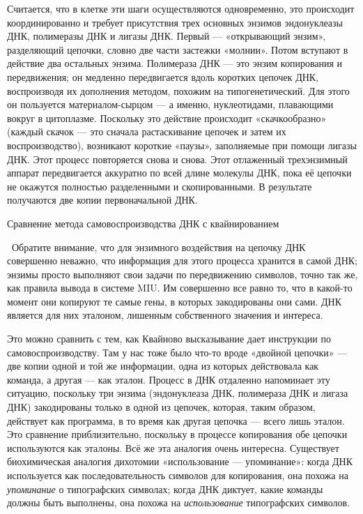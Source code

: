 \documentclass[../main.tex]{subfiles}
\begin{document}
Считается, что в клетке эти шаги осуществляются одновременно, это происходит координированно и требует присутствия трех основных энзимов эндонуклеазы ДНК, полимеразы ДНК и лигазы ДНК\@. Первый --- «открывающий энзим», разделяющий цепочки, словно две части застежки «молнии». Потом вступают в действие два остальных энзима. Полимераза ДНК --- это энзим копирования и передвижения; он медленно передвигается вдоль коротких цепочек ДНК, воспроизводя их дополнения методом, похожим на типогенетический. Для этого он пользуется материалом-сырцом --- а именно, нуклеотидами, плавающими вокруг в цитоплазме. Поскольку это действие происходит «скачкообразно» (каждый скачок --- это сначала растаскивание цепочек и затем их воспроизводство), возникают короткие «паузы», заполняемые при помощи лигазы ДНК\@. Этот процесс повторяется снова и снова. Этот отлаженный трехэнзимный аппарат передвигается аккуратно по всей длине молекулы ДНК, пока её цепочки не окажутся полностью разделенными и скопированными. В результате получаются две копии первоначальной ДНК.

Сравнение метода самовоспроизводства ДНК с квайнированием

~Обратите внимание, что для энзимного воздействия на цепочку ДНК совершенно неважно, что информация для этого процесса хранится в самой ДНК; энзимы просто выполняют свои задачи по передвижению символов, точно так же, как правила вывода в системе MIU\@. Им совершенно все равно то, что в какой-то момент они копируют те самые гены, в которых закодированы они сами. ДНК является для них эталоном, лишенным собственного значения и интереса.

Это можно сравнить с тем, как Квайново высказывание дает инструкции по самовоспроизводству. Там у нас тоже было что-то вроде «двойной цепочки» --- две копии одной и той же информации, одна из которых действовала как команда, а другая --- как эталон. Процесс в ДНК отдаленно напоминает эту ситуацию, поскольку три энзима (эндонуклеаза ДНК, полимераза ДНК и лигаза ДНК) закодированы только в одной из цепочек, которая, таким образом, действует как программа, в то время как другая цепочка --- всего лишь эталон. Это сравнение приблизительно, поскольку в процессе копирования обе цепочки используются как эталоны. Всё же эта аналогия очень интересна. Существует биохимическая аналогия дихотомии «использование --- упоминание»: когда ДНК используется как последовательность символов для копирования, она похожа на \emph{упоминание} о типографских символах; когда ДНК диктует, какие команды должны быть выполнены, она похожа на \emph{использование} типографских символов.
\end{document}
